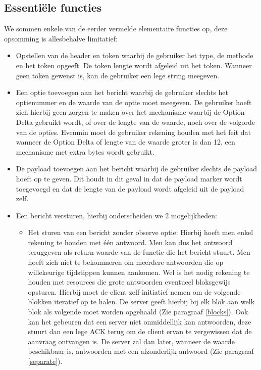 \subsection{Essenti\"{e}le functies} \label{essentielefuncties}

We sommen enkele van de eerder vermelde elementaire functies op, deze opsomming is allesbehalve limitatief:

\begin{itemize}
\item Opstellen van de header en token waarbij de gebruiker het type, de methode en het token opgeeft. De token lengte wordt afgeleid uit het token. Wanneer geen token gewenst is, kan de gebruiker een lege string meegeven.
\item Een optie toevoegen aan het bericht waarbij de gebruiker slechts het optienummer en de waarde van de optie moet meegeven. De gebruiker hoeft zich hierbij geen zorgen te maken over het mechanisme waarbij de Option Delta gebruikt wordt, of over de lengte van de waarde, noch over de volgorde van de opties. Evenmin moet de gebruiker rekening houden met het feit dat wanneer de Option Delta of lengte van de waarde groter is dan 12, een mechanisme met extra bytes wordt gebruikt.
\item De payload toevoegen aan het bericht waarbij de gebruiker slechts de payload hoeft op te geven.  Dit houdt in dit geval in dat de payload marker wordt toegevoegd en dat de lengte van de payload wordt afgeleid uit de payload zelf.
\item Een bericht versturen, hierbij onderscheiden we 2 mogelijkheden:
\begin{itemize}
\item Het sturen van een bericht zonder observe optie: Hierbij hoeft men enkel rekening te houden met \'{e}\'{e}n antwoord. Men kan dus het antwoord teruggeven als return waarde van de functie die het bericht stuurt. Men hoeft zich niet te bekommeren om meerdere antwoorden die op willekeurige tijdstippen kunnen aankomen. Wel is het nodig rekening te houden met resources die grote antwoorden eventueel bloksgewijs opsturen. Hierbij moet de client zelf initiatief nemen om de volgende blokken iteratief op te halen. De server geeft hierbij bij elk blok aan welk blok als volgende moet worden opgehaald (Zie paragraaf \ref{blocks}). Ook kan het gebeuren dat een server niet onmiddellijk kan antwoorden, deze stuurt dan een lege ACK terug om de client ervan te vergewissen dat de aanvraag ontvangen is. De server zal dan later, wanneer de waarde beschikbaar is, antwoorden met een afzonderlijk antwoord (Zie paragraaf \ref{separate}).

\end{itemize}
\end{itemize}
